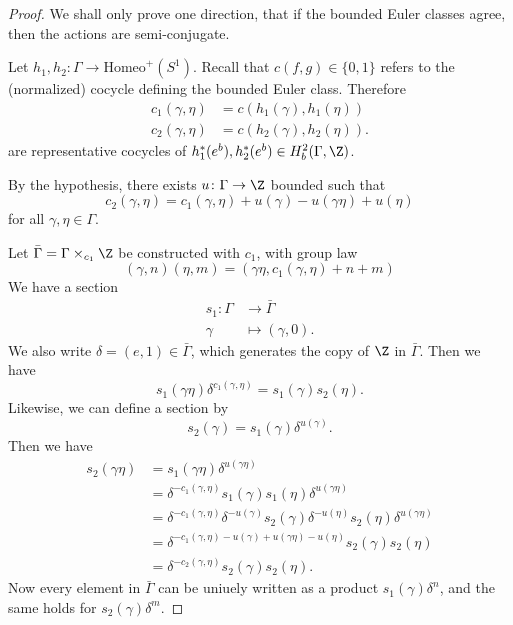 \documentclass[a4paper]{article}
\newcommand\Homeo{\mathrm{Homeo}}
\begin{document}
\begin{proof}
  We shall only prove one direction, that if the bounded Euler classes agree, then the actions are semi-conjugate.

  Let $h_1, h_2\colon \Gamma \to \Homeo^+(S^1)$. Recall that $c(f, g) \in \{0, 1\}$ refers to the (normalized) cocycle defining the bounded Euler class. Therefore
  \begin{align*}
    c_1(\gamma, \eta) &= c(h_1(\gamma), h_1(\eta))\\
    c_2(\gamma, \eta) &= c(h_2(\gamma), h_2(\eta)).
  \end{align*}
  are representative cocycles of $h_1^*(e^b), h_2^*(e^b) \in H_b^2(\Gamma, \Z)$.

  By the hypothesis, there exists $u\colon \Gamma \to \Z$ bounded such that
  \[
    c_2(\gamma, \eta) = c_1(\gamma, \eta) + u(\gamma) - u(\gamma\eta) + u(\eta)
  \]
  for all $\gamma, \eta \in \Gamma$.

  Let $\bar{\Gamma} = \Gamma \times_{c_1} \Z$ be constructed with $c_1$, with group law
  \[
    (\gamma, n)(\eta, m) = (\gamma \eta, c_1(\gamma, \eta) + n + m)
  \]
  We have a section
  \begin{align*}
    s_1\colon \Gamma &\to \bar{\Gamma} \\
    \gamma &\mapsto (\gamma, 0).
  \end{align*}
  We also write $\delta = (e, 1) \in \bar{\Gamma}$, which generates the copy of $\Z$ in $\bar{\Gamma}$. Then we have
  \[
    s_1(\gamma \eta) \delta^{c_1(\gamma, \eta)} = s_1(\gamma) s_2(\eta).
  \]
  Likewise, we can define a section by
  \[
    s_2(\gamma) = s_1(\gamma) \delta^{u(\gamma)}.
  \]
  Then we have
  \begin{align*}
    s_2(\gamma \eta) &= s_1 (\gamma \eta) \delta^{u(\gamma \eta)} \\
    &= \delta^{-c_1(\gamma, \eta)} s_1(\gamma) s_1 (\eta) \delta^{u(\gamma \eta)}\\
    &= \delta^{-c_1(\gamma, \eta)} \delta^{-u(\gamma)} s_2(\gamma) \delta^{-u(\eta)} s_2 (\eta) \delta^{u(\gamma \eta)}\\
    &= \delta^{-c_1(\gamma, \eta) - u(\gamma) + u(\gamma \eta) - u(\eta)} s_2 (\gamma) s_2(\eta)\\
    &= \delta^{-c_2(\gamma, \eta)} s_2(\gamma) s_2(\eta).
  \end{align*}
  Now every element in $\bar{\Gamma}$ can be uniuely written as a product $s_1(\gamma) \delta^n$, and the same holds for $s_2(\gamma) \delta^m$.


\end{proof}
\end{document}
